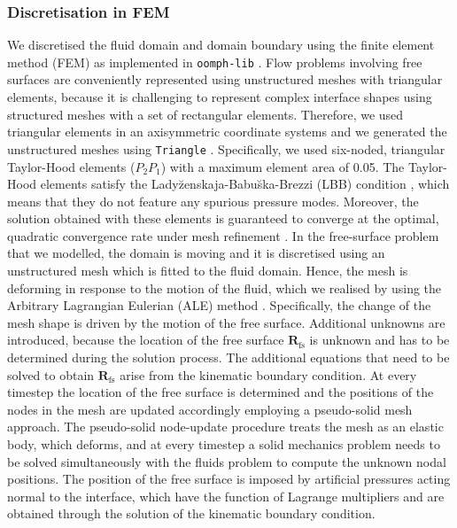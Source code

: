 \documentclass[aip,graphicx]{revtex4-1}
\newcommand{\sym}[1]{\text{#1}} \newcommand{\dif}{\mathrm{d}}
\newcommand{\vect}[1]{\bm{#1}}
\begin{document}
\subsubsection{Discretisation in FEM}

We discretised the fluid domain and domain boundary using the
finite element method (FEM) as implemented in \texttt{oomph-lib}
\cite{HeilHazelOomph2006}.  Flow problems involving free surfaces are
conveniently represented using unstructured meshes with triangular
elements, because it is challenging to represent complex interface
shapes using structured meshes with a set of rectangular elements.
Therefore, we used triangular elements in an axisymmetric coordinate
systems and we generated the unstructured meshes using
\texttt{Triangle} \cite{shewchuk96b}.  Specifically, we used
six-noded, triangular Taylor-Hood \cite{taylor1973numerical} elements
($P_2 P_1$) with a maximum element area of 0.05.  The Taylor-Hood
elements satisfy the Lady\u{z}enskaja-Babu\u{s}ka-Brezzi (LBB)
condition \cite{sani2000incompressible}, which means that they do not
feature any spurious pressure modes.  Moreover, the solution obtained
with these elements is guaranteed to converge at the optimal,
quadratic convergence rate under mesh refinement
\cite{donea2003finite}.  In the free-surface problem that we modelled,
the domain is moving and it is discretised using an unstructured mesh
which is fitted to the fluid domain.  Hence, the mesh is deforming in
response to the motion of the fluid, which we realised by using the
Arbitrary Lagrangian Eulerian (ALE) method \cite{donea1982arbitrary}.
Specifically, the change of the mesh shape is driven by the motion of
the free surface.  Additional unknowns are introduced, because the
location of the free surface $\vect{R}_{\sym{fs}}$ is unknown and has
to be determined during the solution process.  The additional
equations that need to be solved to obtain $\vect{R}_{\sym{fs}}$ arise
from the kinematic boundary condition.  At every timestep the location
of the free surface is determined and the positions of the nodes in
the mesh are updated accordingly employing a pseudo-solid mesh
approach.  The pseudo-solid node-update procedure treats the mesh as
an elastic body, which deforms, and at every timestep a solid
mechanics problem needs to be solved simultaneously with the fluids
problem to compute the unknown nodal positions.  The position of the
free surface is imposed by artificial pressures acting normal to the
interface, which have the function of Lagrange multipliers and are
obtained through the solution of the kinematic boundary condition.
\end{document}
